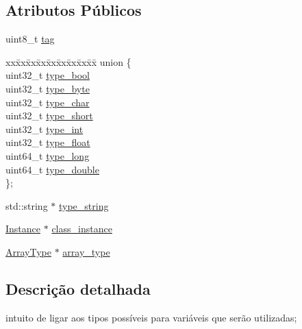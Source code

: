 \subsection*{Atributos Públicos}
\begin{DoxyCompactItemize}
\item 
uint8\+\_\+t \hyperlink{struct_operand_a551b2888783546b27f90b70f5ceeafee}{tag}
\item 
\begin{tabbing}
xx\=xx\=xx\=xx\=xx\=xx\=xx\=xx\=xx\=\kill
union \{\\
\>uint32\_t \hyperlink{struct_operand_a0705136abc78d06866591f4a1304163b}{type\_bool}\\
\>uint32\_t \hyperlink{struct_operand_a8590d48387a47c99940dec06f4262c88}{type\_byte}\\
\>uint32\_t \hyperlink{struct_operand_a7d323bb935c240911633677c632d967b}{type\_char}\\
\>uint32\_t \hyperlink{struct_operand_a9a95367e26a5d3016da0b6d9fc9f0359}{type\_short}\\
\>uint32\_t \hyperlink{struct_operand_a5aa568fddb9132272a9c4e9870825a13}{type\_int}\\
\>uint32\_t \hyperlink{struct_operand_a323c9442608ba57c5556a67dece11c92}{type\_float}\\
\>uint64\_t \hyperlink{struct_operand_acba3d813258f86827e414fb6e6fb6963}{type\_long}\\
\>uint64\_t \hyperlink{struct_operand_a2bae1001957062fa9e95bb13a0afe2a3}{type\_double}\\
\}; \\

\end{tabbing}\item 
std\+::string $\ast$ \hyperlink{struct_operand_ab339ad43cfc3f1c32be042769846f049}{type\+\_\+string}
\item 
\hyperlink{struct_instance}{Instance} $\ast$ \hyperlink{struct_operand_a9afc0307304efd6930acb371bdabe4c2}{class\+\_\+instance}
\item 
\hyperlink{struct_array_type}{Array\+Type} $\ast$ \hyperlink{struct_operand_a79ddf8db90ba729dcee75f0f6669a8ca}{array\+\_\+type}
\end{DoxyCompactItemize}


\subsection{Descrição detalhada}
intuito de ligar aos tipos possíveis para variáveis que serão utilizadas; 

